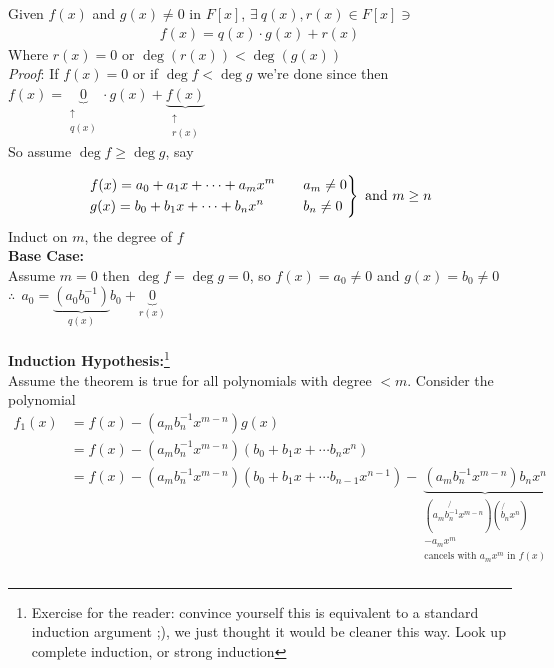 \setcounter{dummy_lemma}{1}
\begin{lemma}
Given $f(x)$ and $g(x)\neq 0$ in $F[x]$, $\exists \ q(x), r(x) \in F[x] \ni $
\begin{align}
    f(x) = q(x)\cdot g(x) + r(x) \nonumber
\end{align}
Where $r(x)=0$ or $\deg(r(x)) < \deg(g(x))$ \\ \steezybreak
\textit{Proof}: If $f(x)=0$ or if $\deg f < \deg g$ we're done since then $f(x)=\underbrace{0}_{\substack{\uparrow \\ q(x)}}\cdot g(x)+\underbrace{f(x)}_{\substack{\uparrow \\ r(x)}}$ \\
So assume $\deg f \geq \deg g$, say

\begin{align}
    \begin{drcases}
        f(x) = a_0 + a_1 x+ \cdots + a_m x^m \ \ \ &a_m \neq 0 \nonumber \\
        g(x) = b_0 + b_1 x+ \cdots + b_n x^n \ \ \ &b_n \neq 0 \nonumber 
    \end{drcases} \text{ and }m\geq n
\end{align}
Induct on $m$, the degree of $f$
\noindent \\ \steezybreak
\textbf{Base Case:} \\  \steezybreak 
Assume $m=0$ then $\deg f=\deg g = 0$, so $f(x) = a_0 \neq 0$ and $g(x)=b_0\neq 0$ \\
\noindent $\therefore \ \ a_0 = \underbrace{(a_0 b_0^{-1})}_{q(x)}b_0 + \underbrace{0}_{r(x)}$ \\ \steezybreak
\\ \steezybreak
\noindent \textbf{Induction Hypothesis:}\footnote{Exercise for the reader: convince yourself this is equivalent to a standard induction argument ;), we just thought it would be cleaner this way. Look up complete induction, or strong induction} \\ \steezybreak
\noindent Assume the theorem is true for all polynomials with degree $< m$. Consider the polynomial
\begin{align}
    f_1(x) &= f(x) - (a_m b_n^{-1}x^{m-n})g(x) \nonumber \\
    &= f(x)-(a_m b_n^{-1}x^{m-n})(b_0+b_1x+\cdots b_nx^n) \nonumber \\
    &= f(x)-(a_m b_n^{-1}x^{m-n})(b_0+b_1x+\cdots b_{n-1}x^{n-1})- \underbrace{(a_m b_n^{-1}x^{m-n})b_nx^n}_{\substack{(a_m\not{b_n^{-1}}x^{m-n})(\not{b_n}x^n) \\ -a_mx^m \\ \text{cancels with }a_mx^m \text{ in }f(x)}}\nonumber \\

\end{align}
\end{lemma}
